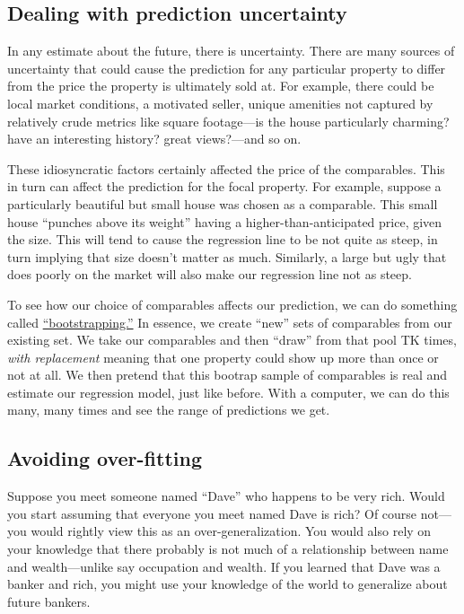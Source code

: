 \documentclass[
12pt, %
letterpaper, %
oneside, %
headinclude,footinclude, %
BCOR5mm, %
]{scrartcl}
\begin{document}
\subsection{Dealing with prediction uncertainty}  \label{sec:bootstrapping} 
In any estimate about the future, there is uncertainty.
There are many sources of uncertainty that could cause the prediction for any particular property to differ from the price the property is ultimately sold at.
For example, there could be local market conditions, a motivated seller, unique amenities not captured by relatively crude metrics like square footage---is the house particularly charming? have an interesting history? great views?---and so on. 

These idiosyncratic factors certainly affected the price of the comparables.
This in turn can affect the prediction for the focal property. 
For example, suppose a particularly beautiful but small house was chosen as a comparable.
This small house ``punches above its weight'' having a higher-than-anticipated price, given the size.
This will tend to cause the regression line to be not quite as steep, in turn implying that size doesn't matter as much.
Similarly, a large but ugly that does poorly on the market will also make our regression line not as steep.

To see how our choice of comparables affects our prediction, we can do something called \href{https://en.wikipedia.org/wiki/Bootstrapping_(statistics)}{``bootstrapping.''}
In essence, we create ``new'' sets of comparables from our existing set.
We take our comparables and then ``draw'' from that pool TK times, \emph{with replacement} meaning that one property could show up more than once or not at all.
We then pretend that this bootrap sample of comparables is real and estimate our regression model, just like before.
With a computer, we can do this many, many times and see the range of predictions we get. 

\subsection{Avoiding over-fitting} \label{sec:regularization}
Suppose you meet someone named ``Dave'' who happens to be very rich.
Would you start assuming that everyone you meet named Dave is rich?
Of course not---you would rightly view this as an over-generalization.
You would also rely on your knowledge that there probably is not much of a relationship between name and wealth---unlike say occupation and wealth.
If you learned that Dave was a banker and rich, you might use your knowledge of the world to generalize about future bankers.
\end{document}
